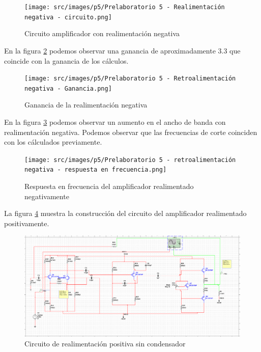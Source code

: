 \begin{figure}[ht]
    \centering
    \texttt{[image: src/images/p5/Prelaboratorio 5 - Realimentación negativa - circuito.png]}
    \caption{Circuito amplificador con realimentación negativa}
    \label{fig:amplificador-realimentado-negativo}
\end{figure}
\FloatBarrier

En la figura \ref{fig:ganancia-realimentacion-negativa} podemos observar una ganancia de aproximadamente $3.3$ que coincide con la ganancia de los cálculos.

\begin{figure}[ht]
    \centering
    \texttt{[image: src/images/p5/Prelaboratorio 5 - Retroalimentación negativa - Ganancia.png]}
    \caption{Ganancia de la realimentación negativa}
    \label{fig:ganancia-realimentacion-negativa}
\end{figure}

En la figura \ref{fig:respuesta-frecuencia-realimentacion-negativa} podemos observar un aumento en el ancho de banda con realimentación negativa. Podemos observar que las frecuencias de corte coinciden con los cálculados previamente.

\begin{figure}[ht]
    \centering
    \texttt{[image: src/images/p5/Prelaboratorio 5 - retroalimentación negativa - respuesta en frecuencia.png]}
    \caption{Respuesta en frecuencia del amplificador realimentado negativamente}
    \label{fig:respuesta-frecuencia-realimentacion-negativa}
\end{figure}
\FloatBarrier


La figura \ref{fig:circuito-realimentacion-positiva-sin-condensador} muestra la construcción del circuito del amplificador realimentado positivamente.

\begin{figure}[ht]
    \centering
    \includegraphics[width=\textwidth]{src/images/p5/Prelaboratorio 5 - Realimentacion positiva sin condensador - circuito.png}
    \caption{Circuito de realimentación positiva sin condensador}
    \label{fig:circuito-realimentacion-positiva-sin-condensador}
\end{figure}

